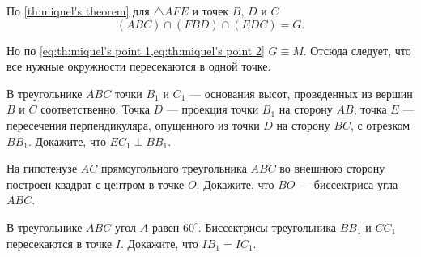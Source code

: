 \begin{tasks}
\begin{tasks}
{            По \cref{th:miquel's theorem} для $\triangle AFE$ и точек $B$, $D$ и $C$
            \begin{equation}
                (ABC) \cap (FBD) \cap (EDC) = G. \label{eq:th:miquel's point 2}
            \end{equation}
            
            Но по \cref{eq:th:miquel's point 1,eq:th:miquel's point 2} $G \equiv M$. Отсюда следует, что все нужные окружности пересекаются в одной точке.
        }
    \end{tasks}

    
    \item В треугольнике $ABC$ точки $B_1$ и $C_1$ --- основания высот, проведенных из вершин $B$ и $C$ соответственно. Точка $D$ --- проекция точки $B_1$ на сторону $AB$, точка $E$ --- пересечения перпендикуляра, опущенного из точки $D$ на сторону $BC$, с отрезком $BB_1$. Докажите, что $EC_1 \perp BB_1$. 


    \item На гипотенузе $AC$ прямоугольного треугольника $ABC$ во вне\-шнюю сторону построен квадрат с центром в точке $O$. Докажите, что $BO$ --- биссектриса угла $ABC$. 


    \item В треугольнике $ABC$ угол $A$ равен $60^\circ$. Биссектрисы треугольника $BB_1$ и $CC_1$ пересекаются в точке $I$. Докажите, что $IB_1=IC_1$. 



\end{tasks}

